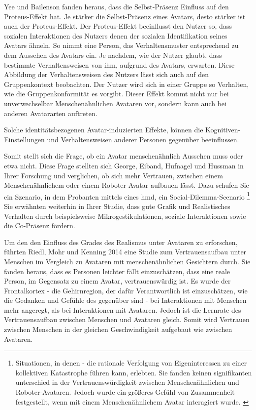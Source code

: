 \documentclass[a4paper,11pt]{article}%
\renewcommand{\\}{\vspace*{0.5\baselineskip} \newline}
\begin{document}
Yee und Bailenson fanden heraus, dass die Selbst-Präsenz Einfluss auf den Proteus-Effekt hat. Je stärker die Selbst-Präsenz eines Avatars, desto stärker ist auch der Proteus-Effekt. Der Proteus-Effekt beeinflusst den Nutzer so, dass sozialen Interaktionen des Nutzers denen der sozialen Identifikation seines Avatars ähneln. So nimmt eine Person, das Verhaltensmuster entsprechend zu dem Aussehen des Avatars ein. Je nachdem, wie der Nutzer glaubt, dass bestimmte Verhaltensweisen von ihm, aufgrund des Avatars, erwarten. \citep{ratan2015leveling} 
Diese Abbildung der Verhaltensweisen des Nutzers lässt sich auch auf den Gruppenkontext beobachten. Der Nutzer wird sich in einer Gruppe so Verhalten, wie die Gruppenkonformität es vorgibt.
Dieser Effekt kommt nicht nur bei unverwechselbar Menschenähnlichen Avataren vor, sondern kann auch bei anderen Avatararten auftreten. \citep{lok2003effects} 

Solche identitätsbezogenen Avatar-induzierten Effekte, können die Kognitiven-Einstellungen und Verhaltensweisen anderer Personen gegenüber beeinflussen.

Somit stellt sich die Frage, ob ein Avatar menschenähnlich Aussehen muss oder etwa nicht. Diese Frage stellten sich George, Eiband, Hufnagel und Hussman \cite{george2018trusting} in Ihrer Forschung und verglichen, ob sich mehr Vertrauen, zwischen einem Menschenähnlichem oder einem Roboter-Avatar aufbauen lässt.
Dazu schufen Sie ein Szenario, in dem Probanten mittels eines \ac{hmd}, ein Social-Dilemma-Scenario  \footnote{Situationen, in denen - die rationale Verfolgung von Eigeninteressen zu einer kollektiven Katastrophe führen kann, erlebten. Sie fanden keinen signifikanten unterschied in der Vertrauenswürdigkeit zwischen Menschenähnlichen und Roboter-Avataren. Jedoch wurde ein größeres Gefühl von Zusammenheit festgestellt, wenn mit einem Menschenähnlichem Avatar interagiert wurde. \citep{kerr1983motivation}}
Sie erwähnten weiterhin in Ihrer Studie, dass gute Grafik und Realistisches Verhalten durch beispielsweise Mikrogestikulationen, soziale Interaktionen sowie die Co-Präsenz fördern. \citep{george2018trusting}

Um den den Einfluss des Grades des Realismus unter Avataren zu erforschen, führten Riedl, Mohr und Kenning 2014 eine Studie zum Vertrauensaufbau unter Menschen im Vergleich zu Avataren mit menschenähnlichen Gesichtern durch. Sie fanden heraus, dass es Personen leichter fällt einzuschätzen, dass eine reale Person, im Gegensatz zu einem Avatar, vertrauenswürdig ist. Es wurde der Frontalkortex - die Gehirnregion, der dafür Verantwortlich ist einzuschätzen, wie die Gedanken und Gefühle des gegenüber sind - bei Interaktionen mit Menschen mehr angeregt, als bei Interaktionen mit Avataren.
Jedoch ist die Lernrate des Vertrauensaufbau zwischen Menschen und Avataren gleich. Somit wird Vertrauen zwischen Menschen in der gleichen Geschwindigkeit aufgebaut wie zwischen Avataren. \cite{riedl2014trusting}
\end{document}
